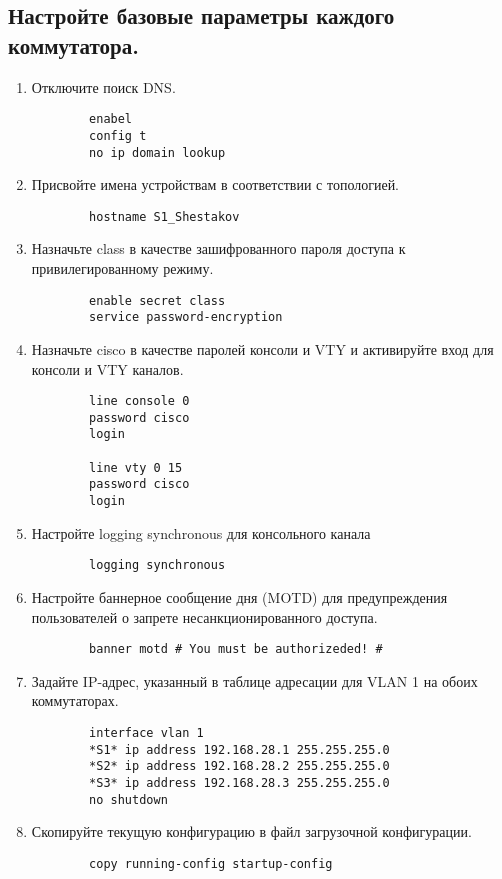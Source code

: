 \subsection{Настройте базовые параметры каждого коммутатора.}
\begin{enumerate}[a]
    \item Отключите поиск DNS\@.
    \begin{verbatim}
        enabel
        config t
        no ip domain lookup
    \end{verbatim}

    \item Присвойте имена устройствам в соответствии с топологией.
    \begin{verbatim}
        hostname S1_Shestakov
    \end{verbatim}

    \item Назначьте class в качестве зашифрованного пароля доступа к привилегированному режиму.
    \begin{verbatim}
        enable secret class
        service password-encryption
    \end{verbatim}

    \item Назначьте cisco в качестве паролей консоли и VTY и активируйте вход для консоли и VTY каналов.
    \begin{verbatim}
        line console 0
        password cisco
        login

        line vty 0 15
        password cisco
        login
    \end{verbatim}

    \item Настройте logging synchronous для консольного канала
    \begin{verbatim}
        logging synchronous
    \end{verbatim}

    \item Настройте баннерное сообщение дня (MOTD) для предупреждения пользователей о запрете
    несанкционированного доступа.
    \begin{verbatim}
        banner motd # You must be authorizeded! #
    \end{verbatim}

    \item Задайте IP-адрес, указанный в таблице адресации для VLAN 1 на обоих коммутаторах.
    \begin{verbatim}
        interface vlan 1
        *S1* ip address 192.168.28.1 255.255.255.0
        *S2* ip address 192.168.28.2 255.255.255.0
        *S3* ip address 192.168.28.3 255.255.255.0
        no shutdown
    \end{verbatim}

    \item Скопируйте текущую конфигурацию в файл загрузочной конфигурации.
    \begin{verbatim}
        copy running-config startup-config
    \end{verbatim}
\end{enumerate}

